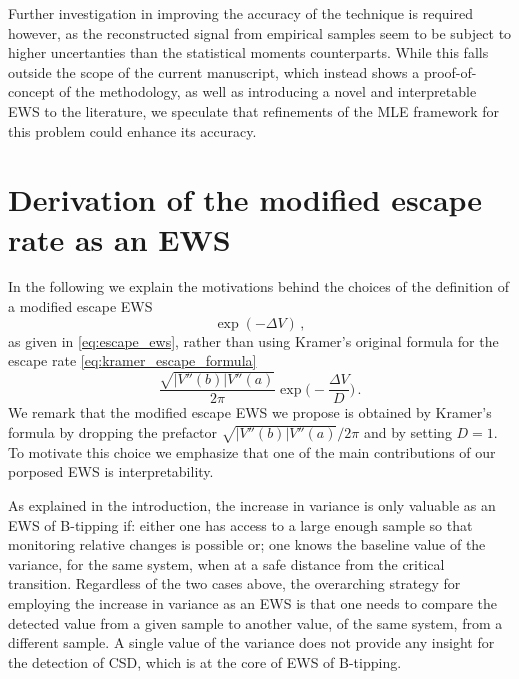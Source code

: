 \documentclass[a4paper,fleqn]{cas-sc}
\begin{document}
Further investigation in improving the accuracy of the technique is required however, as the reconstructed signal from empirical samples seem to be subject to higher uncertanties than the statistical moments counterparts.
While this falls outside the scope of the current manuscript, which instead shows a proof-of-concept of the methodology, as well as introducing a novel and interpretable EWS to the literature, we speculate that refinements of the MLE framework for this problem could enhance its accuracy.
%
\appendix
%
\section{Derivation of the modified escape rate as an EWS}\label{appendix_a}
In the following we explain the motivations behind the choices of the definition of a modified escape EWS
%
\begin{equation*}
        \exp(-\Delta V)\,,
\end{equation*}
%
as given in \eqref{eq:escape_ews}, rather than using Kramer's original formula for the escape rate \eqref{eq:kramer_escape_formula}
%
\begin{equation*}
        \frac{\sqrt{|V''(b)|V''(a)}}{2\pi}\exp\bigg(-\frac{\Delta V}{D}\bigg)\,.
\end{equation*}
%
We remark that the modified escape EWS we propose is obtained by Kramer's formula by dropping the prefactor $\sqrt{|V''(b)|V''(a)}/2\pi$ and by setting $D=1$.
To motivate this choice we emphasize that one of the main contributions of our porposed EWS is interpretability.

As explained in the introduction, the increase in variance is only valuable as an EWS of B-tipping if: either one has access to a large enough sample so that monitoring relative changes is possible or; one knows the baseline value of the variance, for the same system, when at a safe distance from the critical transition.
Regardless of the two cases above, the overarching strategy for employing the increase in variance as an EWS is that one needs to compare the detected value from a given sample to another value, of the same system, from a different sample.
A single value of the variance does not provide any insight for the detection of CSD, which is at the core of EWS of B-tipping.
\end{document}

